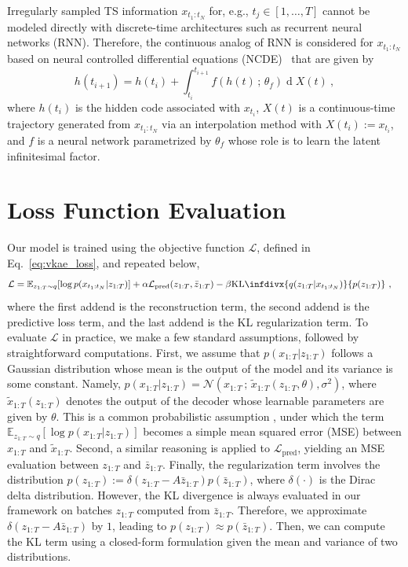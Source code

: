 \documentclass{article} %
\DeclareMathOperator*{\dd}{d}
\newcommand{\kldiv}{\text{KL}\infdivx}
\begin{document}
Irregularly sampled TS information $x_{t_1:t_N}$ for, e.g., $t_j \in [1,\dots,T]$ cannot be modeled directly with discrete-time architectures such as recurrent neural networks (RNN). 
Therefore, the continuous analog of RNN is considered for $x_{t_1:t_N}$ based on neural controlled differential equations (NCDE)~\citep{kidger2020neural} that are given by
\begin{equation}
    h(t_{i+1}) = h(t_i) + \int_{t_i}^{t_{i+1}} f(h(t) \, ; \, \theta_f) \dd X(t) \ ,
\end{equation}
where $h(t_i)$ is the hidden code associated with $x_{t_i}$, $X(t)$ is a continuous-time trajectory generated from $x_{t_1:t_N}$ via an interpolation method with $X(t_i) := x_{t_i}$, and $f$ is a neural network parametrized by $\theta_f$ whose role is to learn the latent infinitesimal factor.

\section{Loss Function Evaluation}
\label{app:loss_func}

Our model is trained using the objective function $\mathcal{L}$, defined in Eq.~\ref{eq:vkae_loss}, and repeated below,
\begin{equation*}
\begin{aligned}
    \mathcal{L} &= \mathbb{E}_{z_{1:T} \sim q}[\log p(x_{t_1:t_N} | z_{1:T})] + \alpha \mathcal{L}_\text{pred}(z_{1:T}, \bar{z}_{1:T}) -\beta \kldiv{q(z_{1:T}| x_{t_1:t_N})}{p(z_{1:T})} \ ,
\end{aligned}
\end{equation*}
where the first addend is the reconstruction term, the second addend is the predictive loss term, and the last addend is the KL regularization term. To evaluate $\mathcal{L}$ in practice, we make a few standard assumptions, followed by straightforward computations. First, we assume that $p(x_{1:T} | z_{1:T})$ follows a Gaussian distribution whose mean is the output of the model and its variance is some constant. Namely, $p(x_{1:T} | z_{1:T}) = \mathcal{N} \left( x_{1:T} \, ; \, \tilde{x}_{1:T}(z_{1:T}, \theta), \sigma^2 \right) $, where $\tilde{x}_{1:T}(z_{1:T})$ denotes the output of the decoder whose learnable parameters are given by $\theta$. This is a common probabilistic assumption \citep{goodfellow2016deep}, under which the term $\mathbb{E}_{z_{1:T} \sim q}[\log p(x_{1:T} | z_{1:T})]$ becomes a simple mean squared error (MSE) between $x_{1:T}$ and $\tilde{x}_{1:T}$. Second, a similar reasoning is applied to $\mathcal{L}_\text{pred}$, yielding an MSE evaluation between $z_{1:T}$ and $\bar{z}_{1:T}$. Finally, the regularization term involves the distribution $p(z_{1:T}) := \delta(z_{1:T} - A \bar{z}_{1:T}) p(\bar{z}_{1:T})$, where $\delta(\cdot)$ is the Dirac delta distribution. However, the KL divergence is always evaluated in our framework on batches $z_{1:T}$ computed from $\bar{z}_{1:T}$. Therefore, we approximate $\delta(z_{1:T} - A \bar{z}_{1:T})$ by $1$, leading to $p(z_{1:T}) \approx p(\bar{z}_{1:T})$. Then, we can compute the KL term using a closed-form formulation given the mean and variance of two distributions.
\end{document}
